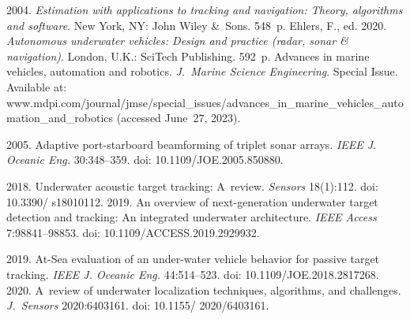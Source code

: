 \vspace*{9pt}

  \begin{multicols}{2}

\renewcommand{\bibname}{\protect\rmfamily References}

{\small\frenchspacing
 {%
 \begin{thebibliography}{99} 
       2004. \textit{Estimation with applications 
to tracking and navigation: Theory, algorithms and software}. New York, NY: John Wiley \&~Sons. 
548~p.
      Ehlers, F., ed. 2020. \textit{Autonomous underwater vehicles: Design and practice  (radar, sonar 
\& navigation)}. London, U.K.: SciTech Publishing. 592~p.
      Advances in marine vehicles, automation and robotics.  \textit{J.~Marine 
Science Engineering}. Special Issue. Available at: {\sf 
www.mdpi.com/journal/jmse/special\_issues/\linebreak advances\_in\_marine\_vehicles\_automation\_and\_robotics} 
(accessed June~27, 2023).

       2005. Adaptive  
port-starboard beamforming of triplet sonar arrays. \textit{IEEE J. Oceanic Eng.} 30:348--359. doi: 
10.1109/JOE.2005.850880.

       2018. Underwater acoustic target tracking: A~review. 
\textit{Sensors} 18(1):112. doi: 10.3390/ s18010112.
       2019. An overview of next-generation underwater target 
detection and tracking: An integrated underwater architecture. \textit{IEEE Access} 7:98841--98853. doi: 
10.1109/ACCESS.2019.2929932.

       2019. At-Sea 
evaluation of an under-water vehicle behavior for passive target tracking. \textit{IEEE J. Oceanic Eng.} 
44:514--523. doi: 10.1109/JOE.2018.2817268.
       2020. A~review of underwater localization 
techniques, algorithms, and challenges. \textit{J.~Sensors} 2020:6403161. doi: 10.1155/ 2020/6403161.
     
      
      

\end{thebibliography}}}
\end{multicols}
